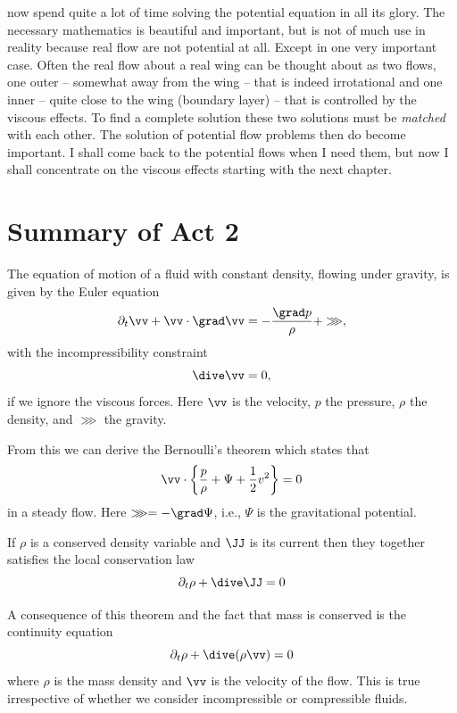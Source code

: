 now spend quite a lot of time solving the potential equation in all
its glory. The necessary mathematics is beautiful and important, but
is not of much use in reality because real flow are not potential at
all. Except in one very important case. Often the real flow about a
real wing can be thought about as two flows, one outer -- somewhat
away from the wing -- that is indeed irrotational and one inner --
quite close to the wing (boundary layer) -- that is controlled by the
viscous effects. To find a complete solution these two solutions must
be \textit{matched} with each other. The solution of potential flow
problems then do become important.  I shall come back to the potential
flows when I need them, but now I shall concentrate on the viscous
effects starting with the next chapter. 





\newpage
\section*{Summary of Act 2}
\begin{thm-non}
The equation of motion of a fluid with constant density, 
flowing under gravity, is given by the Euler equation
\begin{equation}
\partial_t \vv + \vv\cdot\grad\vv = -\frac{\grad p}{\rho}+\ggg   \/,
\nonumber
\end{equation}
with the incompressibility constraint
\begin{equation}
\dive \vv = 0 \/,
\nonumber
\end{equation}
if we ignore the viscous forces.
Here $\vv$ is the velocity, $p$ the pressure,
 $\rho$ the density, and $\ggg$ the gravity. 
\end{thm-non}
From this we can derive the Bernoulli's theorem which states that 
\begin{equation}
\vv\cdot\left\{ \frac{p}{\rho} + \Psi + \frac{1}{2}v^2\right\} = 0
\nonumber
\end{equation}
in a steady flow. Here $\ggg = -\grad\Psi$, i.e., $\Psi$ is the gravitational potential.   
 
\begin{thm-non}
If $\rho$ is a conserved density variable and $\JJ$ is its current then they 
together satisfies the local conservation law
\begin{equation}
\partial_t \rho + \dive \JJ = 0 
\nonumber
\end{equation}
\end{thm-non}
A consequence of this theorem and the fact that mass is conserved is the continuity equation
\begin{equation}
\partial_t \rho + \dive(\rho\vv) = 0
\end{equation}
where $\rho$ is the mass density and $\vv$ is the velocity of the flow. 
This is true irrespective of whether we consider incompressible or
compressible fluids. 
